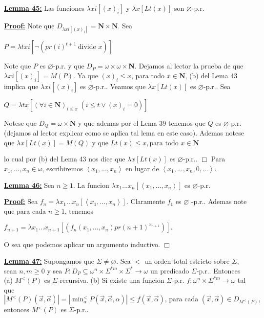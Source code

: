 \textbf{\underline{Lemma 45:}} Las funciones \(\lambda xi\left[ (x)_{i}\right] \) y \(\lambda x\left[ Lt(x) \right] \) son \(\varnothing \)-p.r.

\textbf{\underline{Proof:}} Note que \(D_{\lambda xi\left[ (x)_{i}\right] }=\mathbf{N}\times \mathbf{N}\). Sea

\(\displaystyle P=\lambda txi\left[ \lnot (pr(i)^{t+1}\ \text{divide }x)\right] \)

Note que \(P\) es \(\varnothing \)-p.r. y que \(D_{P}=\omega \times \omega \times \mathbf{N}\). Dejamos al lector la prueba de que \(\lambda xi\left[ (x)_{i} \right] =M(P)\). Ya que \((x)_{i}\leq x\), para todo \(x\in \mathbf{N}\), (b) del Lema 43 implica que \(\lambda xi\left[ (x)_{i}\right] \) es \( \varnothing \)-p.r..
Veamos que \(\lambda x\left[ Lt(x)\right] \) es \(\varnothing \)-p.r.. Sea

\(\displaystyle Q=\lambda tx\left[ (\forall i\in \mathbf{N})_{i\leq x}\;(i\leq t\vee (x)_{i}=0)\right] \)

Notese que \(D_{Q}=\omega \times \mathbf{N}\) y que ademas por el Lema 39 tenemos que \(Q\) es \(\varnothing \)-p.r. (dejamos al lector explicar como se aplica tal lema en este caso). Ademas notese que \(\lambda x \left[ Lt(x)\right] =M(Q)\) y que
\(\displaystyle Lt(x)\leq x,\text{para todo }x\in \mathbf{N} \)

lo cual por (b) del Lema 43 nos dice que \(\lambda x\left[ Lt(x)\right] \) es \(\varnothing \)-p.r.. \(\Box\)
Para \(x_{1},...,x_{n}\in \omega \), escribiremos \(\left\langle x_{1},...,x_{n}\right\rangle \) en lugar de \(\left\langle x_{1},...,x_{n},0,...\right\rangle \).



\textbf{\underline{Lemma 46:}} Sea \(n\geq 1\). La funcion \(\lambda x_{1}...x_{n}\left[ \left\langle x_{1},...,x_{n}\right\rangle \right] \) es \(\varnothing \)-p.r.

\textbf{\underline{Proof:}} Sea \(f_{n}=\lambda x_{1}...x_{n}\left[ \left\langle x_{1},...,x_{n}\right\rangle \right] \). Claramente \(f_{1}\) es \(\varnothing \) -p.r.. Ademas note que para cada \(n\geq 1\), tenemos

\(\displaystyle f_{n+1}=\lambda x_{1}...x_{n+1}\left[ \left( f_{n}(x_{1},...,x_{n})pr(n+1)^{x_{n+1}}\right) \right] \text{.} \)

O sea que podemos aplicar un argumento inductivo. \(\Box\)


\textbf{\underline{Lemma 47:}} Supongamos que \(\Sigma \neq \varnothing \). Sea \(< \) un orden total estricto sobre \(\Sigma \), sean \(n,m\geq 0\) y sea \( P:D_{P}\subseteq \omega ^{n}\times \Sigma ^{\ast m}\times \Sigma ^{\ast }\rightarrow \omega \) un predicado \(\Sigma \)-p.r.. Entonces
(a) \(M^{< }(P)\) es \(\Sigma \)-recursiva.
(b) Si existe una funcion \(\Sigma \)-p.r. \(f:\omega ^{n}\times \Sigma ^{\ast m}\rightarrow \omega \) tal que
\(\displaystyle \left\vert M^{< }(P)(\vec{x},\vec{\alpha})\right\vert =\left\vert \min\nolimits_{\alpha }^{< }P(\vec{x},\vec{\alpha},\alpha )\right\vert \leq f( \vec{x},\vec{\alpha})\text{, para cada }(\vec{x},\vec{\alpha})\in D_{M^{< }(P)}\text{,} \)
entonces \(M^{< }(P)\) es \(\Sigma \)-p.r..


